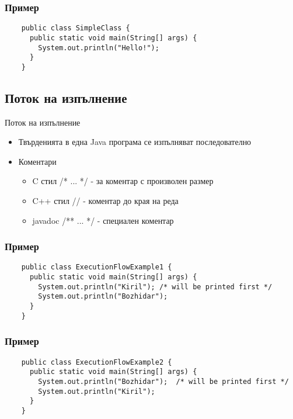 \documentclass{beamer}
\begin{document}
\begin{frame}[fragile]
 \frametitle{Пример}
 \begin{lstlisting}
    public class SimpleClass {
      public static void main(String[] args) {
        System.out.println("Hello!");
      }
    }
  \end{lstlisting}
\end{frame}

\subsection{Поток на изпълнение}
\begin{frame}{Поток на изпълнение}
  
  \begin{itemize}
    \item Твърденията в една Java програма се изпълняват последователно
    \item Коментари
      
      \begin{itemize}
        \item C стил /* ... */ - за коментар с произволен размер
        \item C++ стил // - коментар до края на реда
        \item javadoc /** ... */ - специален коментар
      \end{itemize}

  \end{itemize}

\end{frame}

\begin{frame}[fragile]
  \frametitle{Пример}
  \begin{lstlisting}
    public class ExecutionFlowExample1 {
      public static void main(String[] args) {
        System.out.println("Kiril"); /* will be printed first */
        System.out.println("Bozhidar");
      }
    }
  \end{lstlisting}
\end{frame}

\begin{frame}[fragile]
  \frametitle{Пример}
  \begin{lstlisting}
    public class ExecutionFlowExample2 {
      public static void main(String[] args) {
        System.out.println("Bozhidar");  /* will be printed first */
        System.out.println("Kiril");
      }
    }
  \end{lstlisting}
\end{frame}
\end{document}
